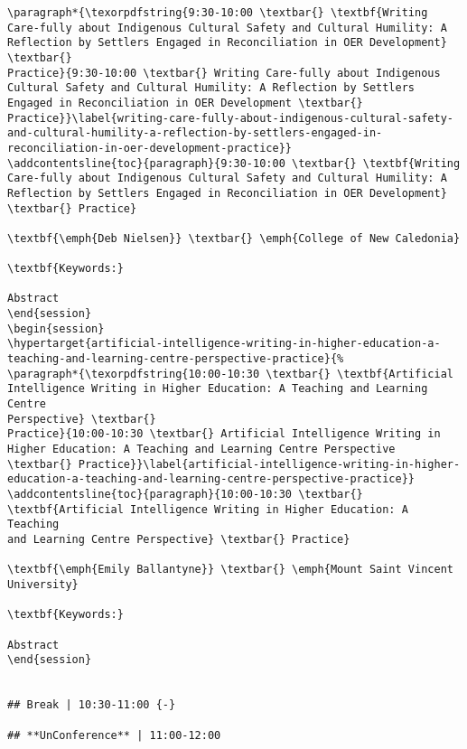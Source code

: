 \documentclass[
]{book}
\begin{document}
\begin{verbatim}
\paragraph*{\texorpdfstring{9:30-10:00 \textbar{} \textbf{Writing
Care-fully about Indigenous Cultural Safety and Cultural Humility: A
Reflection by Settlers Engaged in Reconciliation in OER Development}
\textbar{}
Practice}{9:30-10:00 \textbar{} Writing Care-fully about Indigenous Cultural Safety and Cultural Humility: A Reflection by Settlers Engaged in Reconciliation in OER Development \textbar{} Practice}}\label{writing-care-fully-about-indigenous-cultural-safety-and-cultural-humility-a-reflection-by-settlers-engaged-in-reconciliation-in-oer-development-practice}}
\addcontentsline{toc}{paragraph}{9:30-10:00 \textbar{} \textbf{Writing
Care-fully about Indigenous Cultural Safety and Cultural Humility: A
Reflection by Settlers Engaged in Reconciliation in OER Development}
\textbar{} Practice}

\textbf{\emph{Deb Nielsen}} \textbar{} \emph{College of New Caledonia}

\textbf{Keywords:}

Abstract
\end{session}
\begin{session}
\hypertarget{artificial-intelligence-writing-in-higher-education-a-teaching-and-learning-centre-perspective-practice}{%
\paragraph*{\texorpdfstring{10:00-10:30 \textbar{} \textbf{Artificial
Intelligence Writing in Higher Education: A Teaching and Learning Centre
Perspective} \textbar{}
Practice}{10:00-10:30 \textbar{} Artificial Intelligence Writing in Higher Education: A Teaching and Learning Centre Perspective \textbar{} Practice}}\label{artificial-intelligence-writing-in-higher-education-a-teaching-and-learning-centre-perspective-practice}}
\addcontentsline{toc}{paragraph}{10:00-10:30 \textbar{}
\textbf{Artificial Intelligence Writing in Higher Education: A Teaching
and Learning Centre Perspective} \textbar{} Practice}

\textbf{\emph{Emily Ballantyne}} \textbar{} \emph{Mount Saint Vincent
University}

\textbf{Keywords:}

Abstract
\end{session}


## Break | 10:30-11:00 {-}

## **UnConference** | 11:00-12:00



\end{verbatim}
\end{document}
